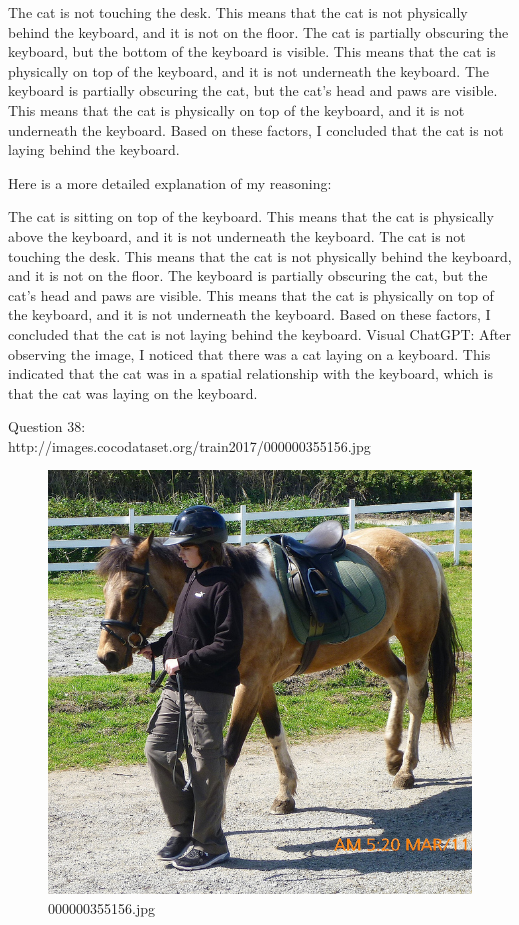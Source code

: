 \begin{enumerate}
        The cat is not touching the desk. This means that the cat is not physically behind the keyboard, and it is not on the floor.
        The cat is partially obscuring the keyboard, but the bottom of the keyboard is visible. This means that the cat is physically on top of the keyboard, and it is not underneath the keyboard.
        The keyboard is partially obscuring the cat, but the cat's head and paws are visible. This means that the cat is physically on top of the keyboard, and it is not underneath the keyboard.
        Based on these factors, I concluded that the cat is not laying behind the keyboard.
        
        Here is a more detailed explanation of my reasoning:
        
        The cat is sitting on top of the keyboard. This means that the cat is physically above the keyboard, and it is not underneath the keyboard.
        The cat is not touching the desk. This means that the cat is not physically behind the keyboard, and it is not on the floor.
        The keyboard is partially obscuring the cat, but the cat's head and paws are visible. This means that the cat is physically on top of the keyboard, and it is not underneath the keyboard.
        Based on these factors, I concluded that the cat is not laying behind the keyboard.
        \subitem Visual ChatGPT: After observing the image, I noticed that there was a cat laying on a keyboard. This indicated that the cat was in a spatial relationship with the keyboard, which is that the cat was laying on the keyboard.
    \end{enumerate}
    Question 38:\\http://images.cocodataset.org/train2017/000000355156.jpg
    \begin{figure}[h]
        \centering
        \includegraphics[width=0.8\linewidth]{../image set/easy/000000355156.jpg}
        \caption{000000355156.jpg}
    \end{figure}
